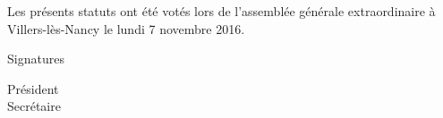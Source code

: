 \documentclass{article}
\begin{document}
	\vspace*{5cm}
	\begin{center}
		{\large\light Les présents statuts ont été votés lors de l’assemblée
		générale extraordinaire à Villers-lès-Nancy le lundi 7 novembre 2016.}
	\end{center}
    \vspace{3cm}
	Signatures\par
	\begin{multicols}{2}
	    \begin{center}
	        Président \\
	        Secrétaire
	    \end{center}
	\end{multicols}
    
\end{document}
